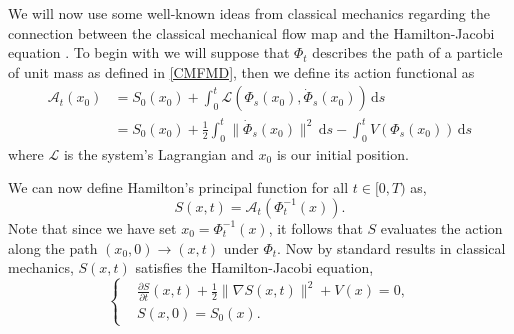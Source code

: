 \documentclass[a4paper,12pt,draft]{report}
\begin{document}
We will now use some well-known ideas from classical mechanics regarding the connection between the classical mechanical flow map and the Hamilton-Jacobi equation \cite{Arnol'd}.  To begin with we will suppose that $\Phi_t$ describes the path of a particle of unit mass as defined in \eqref{CMFMD}, then we define its action functional as
\begin{align}
\mathscr{A}_t(x_0) & = S_0(x_0) + \int_0^t \mathscr{L}(\Phi_s(x_0), \dot{\Phi}_s(x_0)) \,\mathrm{d}s\nonumber\\
& = S_0(x_0) + \frac{1}{2}\int_0^t \|\dot{\Phi}_s(x_0)\|^2 \,\mathrm{d}s - \int_0^t V(\Phi_s(x_0)) \,\mathrm{d}s\nonumber
\end{align}
where $\mathscr{L}$ is the system's Lagrangian and $x_0$ is our initial position.

We can now define Hamilton's principal function for all $t \in [0, T)$ as,
$$
S(x, t) = \mathscr{A}_t(\Phi_t^{-1}(x)).
$$
Note that since we have set $x_0 = \Phi_t^{-1}(x)$, it follows that $S$ evaluates the action along the path $(x_0, 0) \to (x, t)$ under $\Phi_t$.  Now by standard results in classical mechanics, $S(x, t)$ satisfies the Hamilton-Jacobi equation,
\begin{equation}
\left\{
\begin{aligned}
& \frac{\partial S}{\partial t}(x, t) + \frac{1}{2}\|\nabla S(x, t)\|^2 + V(x) = 0,\\ \label{HJE}
& S(x, 0) = S_0(x).
\end{aligned}
\right.
\end{equation}
\end{document}
